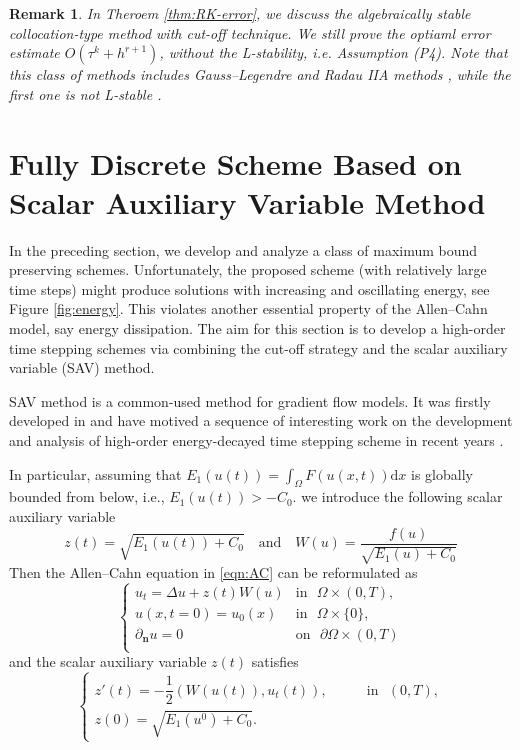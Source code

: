 \documentclass[a4paper, oneside]{book}
\def\d{{\mathrm{d}}}
\def\d{\mathrm{d}}
\newtheorem{remark}{Remark}[section]
\begin{document}
\begin{remark}\label{rem:RK}
In Theroem \ref{thm:RK-error}, we discuss the algebraically stable collocation-type method with cut-off technique.
We still prove the optiaml error estimate $O(\tau^k + h^{r+1})$, without the L-stability, i.e. Assumption (P4).
Note that this class of methods includes Gauss--Legendre and Radau IIA methods \cite[Theorem 12.9]{HairerWanner:2010},
while the first one is not L-stable \cite[Table 5.13]{HairerWanner:2010}.
\end{remark}




\section{Fully Discrete Scheme Based on Scalar Auxiliary Variable Method}\label{sec:sav}
In the preceding section, we develop and analyze a class of maximum bound preserving schemes.
Unfortunately,  the proposed scheme (with relatively large time steps) might produce solutions
with increasing and oscillating energy, see Figure \ref{fig:energy}.
This violates another essential property of the Allen--Cahn model, say energy dissipation.
The aim for this section is to develop
a high-order time stepping schemes via combining the cut-off strategy and
the scalar auxiliary variable (SAV) method.

SAV method is a common-used method for  gradient flow models. It was firstly developed in
\cite{shen2018scalar,shen2019new} and have motived a sequence of interesting work on the
development and analysis of high-order energy-decayed time stepping scheme
in recent years \cite{akrivis2019energy,ShenXu:2018,Gong:2020}.

In particular, assuming that $E_1(u(t)) = \int_{\Omega}F(u(x,t))\d x$  is globally bounded from below,
i.e., $E_1(u(t)) > -C_0$.
we introduce the following scalar auxiliary variable \cite{shen2018scalar}
\begin{equation}\label{eq:scalar}
 z(t) = \sqrt{E_1(u(t)) + C_0}\quad \text{and} \quad W(u) = \dfrac{f(u)}{\sqrt{E_1(u) + C_0}}
\end{equation}
Then the Allen--Cahn equation in \eqref{eqn:AC} can be reformulated as
\begin{equation}\label{eqn:AC-sav}
    \begin{cases}
    u_t = \Delta u + z(t) W(u) &
        \mbox{in~~} \Omega\times(0,T),\\
    u(x,t=0) = u_0(x)   &
        \mbox{in~~} \Omega\times\{0\},\\
    \partial_{\mathbf{n}}u = 0  &
        \mbox{on~~} \partial\Omega\times(0,T)\\
  \end{cases}
\end{equation}
and the scalar auxiliary variable $z(t)$ satisfies
\begin{equation}\label{eqn:r}
\begin{cases}
    z'(t) = -\dfrac12(W(u(t)), u_t(t)),&\qquad \mbox{in~~} (0,T),\\
   z(0) = \sqrt{E_1(u^0) + C_0}.&
 \end{cases}
\end{equation}
\end{document}
